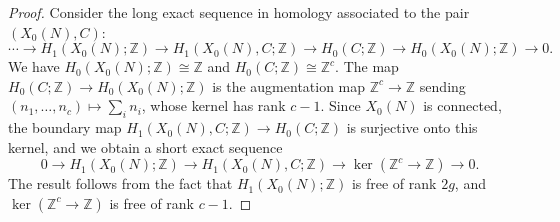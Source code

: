 \documentclass[10pt,a4paper]{amsart}
\newcommand{\ZZ}{\mathbb{Z}}
\begin{document}
\begin{proof}
	Consider the long exact sequence in homology associated to the pair
	$(X_0(N), C)$:
	\[
	\cdots \to H_1(X_0(N);\ZZ) \to H_1(X_0(N),C;\ZZ)
	\to H_0(C;\ZZ) \to H_0(X_0(N);\ZZ) \to 0.
	\]
	We have $H_0(X_0(N);\ZZ)\cong \ZZ$ and $H_0(C;\ZZ)\cong \ZZ^c$. The map
	$H_0(C;\ZZ)\to H_0(X_0(N);\ZZ)$ is the augmentation map
	$\ZZ^c \to \ZZ$ sending $(n_1,\dots,n_c)\mapsto \sum_i n_i$, whose kernel has
	rank $c-1$. Since $X_0(N)$ is connected, the boundary map
	$H_1(X_0(N),C;\ZZ)\to H_0(C;\ZZ)$ is surjective onto this kernel, and we obtain
	a short exact sequence
	\[
	0 \to H_1(X_0(N);\ZZ) \to H_1(X_0(N),C;\ZZ) \to \ker(\ZZ^c\to\ZZ) \to 0.
	\]
	The result follows from the fact that $H_1(X_0(N);\ZZ)$ is free of rank $2g$, and $\ker(\ZZ^c\to\ZZ)$ is free of
	rank $c-1$.
\end{proof}
\end{document}
